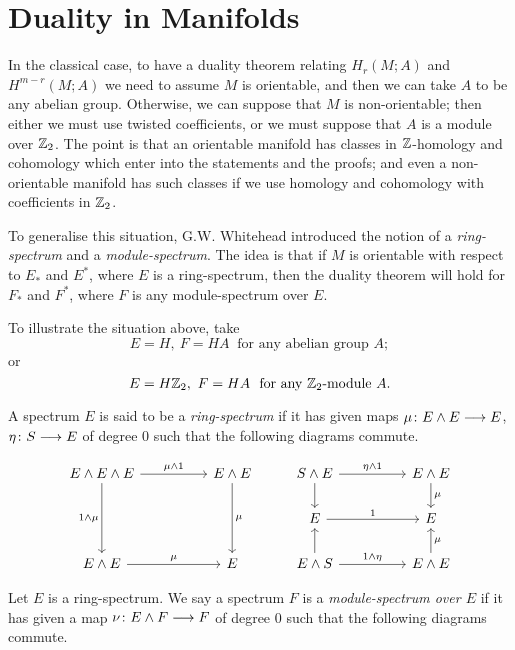 \documentclass[../main]{subfiles}
\begin{document}
\chapter{Duality in Manifolds}
\label{sec:p3c10}
In the classical case, to have a duality theorem relating $H_r(M;A)$ and $H^{m-r}(M;A)$ we need to assume $M$ is orientable, and then we can take $A$ to be any abelian group. Otherwise, we can suppose that $M$ is non-orientable; then either we must use twisted coefficients, or we must suppose that $A$ is a module over $\mathbb{Z}_2$. The point is that an orientable manifold has classes in $\mathbb{Z}$-homology and cohomology which enter into the statements and the proofs; and even a non-orientable manifold has such classes if we use homology and cohomology with coefficients in $\mathbb{Z}_2$. 

To generalise this situation, G.W. Whitehead introduced the notion of a \emph{ring-spectrum} and a \emph{module-spectrum}. The idea is that if $M$ is orientable with respect to $E_*$ and $E^*$, where $E$ is a ring-spectrum, then the duality theorem will hold for $F_*$ and $F^*$, where $F$ is any module-spectrum over $E$.
\begin{examples}
To illustrate the situation above, take
\[E=H, \ F=HA \ \text{ for any abelian group } A;\]
or
\[E = H\mathbb{Z}_2, \ F=HA \ \text{ for any $\mathbb{Z}_2$-module } A.\]
\end{examples}

A spectrum $E$ is said to be a \emph{ring-spectrum}  if it has given maps $\mu \colon E \wedge E \longrightarrow E$, $\eta \colon S \longrightarrow E$ of degree 0 such that the following diagrams commute.


\[
\begin{tikzcd}
E \wedge E \wedge E \arrow[dd, "1 \wedge \mu"'] \arrow[rr, "\mu \wedge 1"] &  & E \wedge E \arrow[dd, "\mu"] & S \wedge E \arrow[rr, "\eta \wedge 1"] \arrow[d] &  & E \wedge E \arrow[d, "\mu"] \\
                                                                           &  &                              & E \arrow[rr, "1"]                                &  & E                           \\
E \wedge E \arrow[rr, "\mu"]                                               &  & E                            & E \wedge S \arrow[rr, "1 \wedge \eta"] \arrow[u] &  & E \wedge E \arrow[u, "\mu"']
\end{tikzcd}
\]

Let $E$ is a ring-spectrum. We say a spectrum $F$ is a \emph{module-spectrum over $E$}  if it has given a map $\nu \colon E \wedge F \longrightarrow F$ of degree 0 such that the following diagrams commute.
\end{document}
